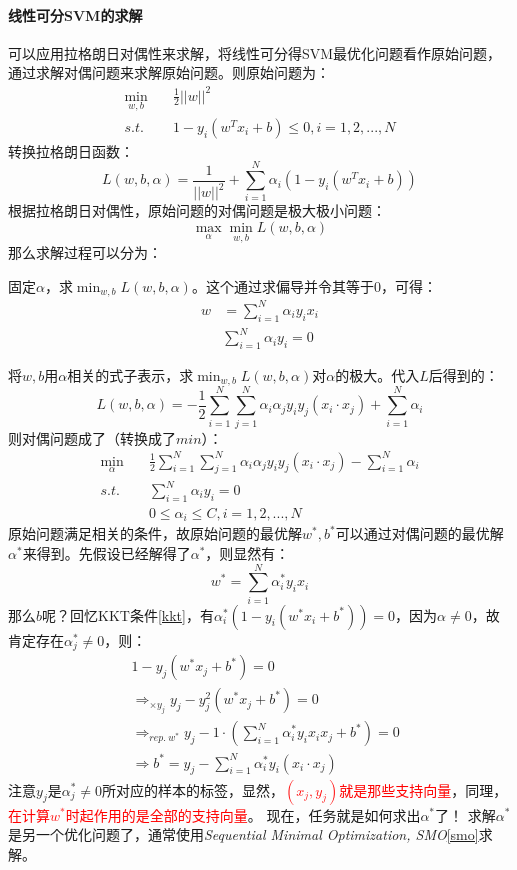 \paragraph{线性可分SVM的求解}
可以应用拉格朗日对偶性来求解，将线性可分得SVM最优化问题看作原始问题，通过求解对偶问题来求解原始问题。则原始问题为：
\begin{align}
	\mathop{min}_{w, b}&\quad \frac{1}{2}||w||^2 \nonumber \\
	s.t.&\quad 1 - y_i(w^T x_i + b) \leq 0, i = 1, 2, ..., N \nonumber
\end{align}
转换拉格朗日函数：
$$
L(w, b, \alpha) = \frac{1}{||w||^2} + \sum_{i=1}^{N} \alpha_i (1  - y_i(w^T x_i + b))
$$
根据拉格朗日对偶性，原始问题的对偶问题是极大极小问题：
$$
\mathop{max}_{\alpha} \mathop{min}_{w, b} L(w, b, \alpha)
$$
那么求解过程可以分为：
\begin{myenumerate}
	\item 固定$\alpha$，求$\mathop{min}_{w, b} L(w, b, \alpha)$。这个通过求偏导并令其等于0，可得：
	\begin{align}
		w &= \sum_{i=1}^N \alpha_i y_i x_i	\nonumber \\
		&\sum_{i=1}^N \alpha_i y_i = 0 \nonumber
	\end{align}
	
	\item 将$w, b$用$\alpha$相关的式子表示，求$\mathop{min}_{w, b} L(w, b, \alpha)$对$\alpha$的极大。代入$L$后得到的：
	$$
	L(w, b, \alpha) = -\frac{1}{2} \sum_{i=1}^N \sum_{j=1}^{N} \alpha_i \alpha_j y_i y_j (x_i \cdot x_j) + \sum_{i=1}^N \alpha_i
	$$	
	则对偶问题成了（转换成了$min$）：
	\begin{align}
		\mathop{min}_{\alpha}\quad &\frac{1}{2} \sum_{i=1}^N \sum_{j=1}^{N} \alpha_i \alpha_j y_i y_j (x_i \cdot x_j) - \sum_{i=1}^N \alpha_i \nonumber \\
		s.t.\quad &\sum_{i=1}^N \alpha_i y_i = 0 \nonumber \\
				  &0 \leq \alpha_i \leq C, i = 1, 2, ..., N \nonumber
	\end{align}
	原始问题满足相关的条件，故原始问题的最优解$w^*, b^*$可以通过对偶问题的最优解$\alpha^*$来得到。先假设已经解得了$\alpha^*$，则显然有：
	$$
	w^* = \sum_{i=1}^N \alpha_i^* y_i x_i
	$$
	那么$b$呢？回忆KKT条件\ref{kkt}，有$\alpha_i^* (1 - y_i(w^* x_i + b^*)) = 0$，因为$\alpha \neq 0$，故肯定存在$\alpha_j^* \neq 0$，则：
	\begin{align}
		&1 - y_j(w^* x_j + b^*) = 0 \nonumber \\
		&\mathop{\Longrightarrow}_{\times y_j} y_j - y_j^2 (w^* x_j + b^*) = 0 \nonumber \\
		&\mathop{\Longrightarrow}_{rep.\  w^*} y_j - 1 \cdot (\sum_{i=1}^N \alpha_i^* y_i x_i x_j + b^*) = 0 \nonumber \\
		&\Longrightarrow b^* = y_j - \sum_{i=1}^N \alpha_i^* y_i (x_i \cdot x_j) \nonumber 
	\end{align}
	注意$y_j$是$\alpha_j^* \neq 0$所对应的样本的标签，显然，\textcolor{red}{$(x_j, y_j)$就是那些支持向量}，同理，\textcolor{red}{在计算$w^*$时起作用的是全部的支持向量}。
	现在，任务就是如何求出$\alpha^*$了！	求解$\alpha^*$是另一个优化问题了，通常使用\textit{Sequential Minimal Optimization, SMO}\ref{smo}求解。
\end{myenumerate}

